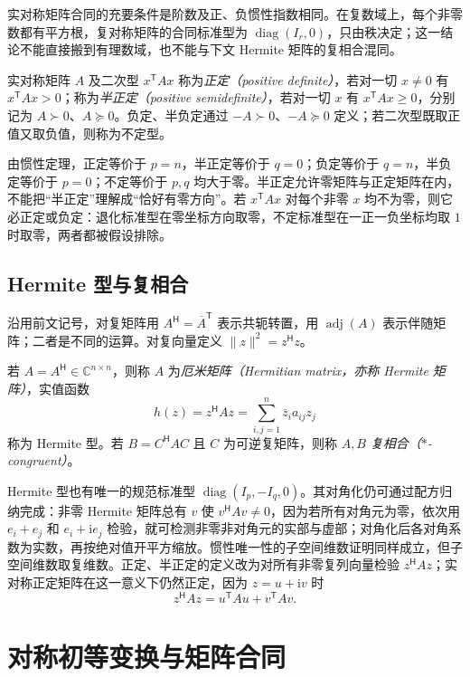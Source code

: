 实对称矩阵合同的充要条件是阶数及正、负惯性指数相同。在复数域上，每个非零数都有平方根，复对称矩阵的合同标准型为 $\operatorname{diag}(I_r,0)$，只由秩决定；这一结论不能直接搬到有理数域，也不能与下文 Hermite 矩阵的复相合混同。

\begin{definition}
实对称矩阵 $A$ 及二次型 $x^{\mathsf T}Ax$ 称为\emph{正定（positive definite）}，若对一切 $x\ne0$ 有 $x^{\mathsf T}Ax>0$；称为\emph{半正定（positive semidefinite）}，若对一切 $x$ 有 $x^{\mathsf T}Ax\ge0$，分别记为 $A\succ0$、$A\succeq0$。负定、半负定通过 $-A\succ0$、$-A\succeq0$ 定义；若二次型既取正值又取负值，则称为不定型。
\end{definition}

由惯性定理，正定等价于 $p=n$，半正定等价于 $q=0$；负定等价于 $q=n$，半负定等价于 $p=0$；不定等价于 $p,q$ 均大于零。半正定允许零矩阵与正定矩阵在内，不能把“半正定”理解成“恰好有零方向”。若 $x^{\mathsf T}Ax$ 对每个非零 $x$ 均不为零，则它必正定或负定：退化标准型在零坐标方向取零，不定标准型在一正一负坐标均取 $1$ 时取零，两者都被假设排除。

\subsection{Hermite 型与复相合}

沿用前文记号，对复矩阵用 $A^{\mathsf H}=\overline A^{\mathsf T}$ 表示共轭转置，用 $\operatorname{adj}(A)$ 表示伴随矩阵；二者是不同的运算。对复向量定义 $\|z\|^2=z^{\mathsf H}z$。
\begin{definition}
若 $A=A^{\mathsf H}\in\mathbb C^{n\times n}$，则称 $A$ 为\emph{厄米矩阵（Hermitian matrix，亦称 Hermite 矩阵）}，实值函数
\[
 h(z)=z^{\mathsf H}Az=\sum_{i,j=1}^n\overline z_i a_{ij}z_j
\]
称为 Hermite 型。若 $B=C^{\mathsf H}AC$ 且 $C$ 为可逆复矩阵，则称 $A,B$ \emph{复相合（$*$-congruent）}。
\end{definition}

Hermite 型也有唯一的规范标准型 $\operatorname{diag}(I_p,-I_q,0)$。其对角化仍可通过配方归纳完成：非零 Hermite 矩阵总有 $v$ 使 $v^{\mathsf H}Av\ne0$，因为若所有对角元为零，依次用 $e_i+e_j$ 和 $e_i+\mathrm i e_j$ 检验，就可检测非零非对角元的实部与虚部；对角化后各对角系数为实数，再按绝对值开平方缩放。惯性唯一性的子空间维数证明同样成立，但子空间维数取复维数。正定、半正定的定义改为对所有非零复列向量检验 $z^{\mathsf H}Az$；实对称正定矩阵在这一意义下仍然正定，因为 $z=u+\mathrm i v$ 时
\[
 z^{\mathsf H}Az=u^{\mathsf T}Au+v^{\mathsf T}Av.
\]

\section{对称初等变换与矩阵合同}
\label{sec:xie-ex-qf-block-congruence}

